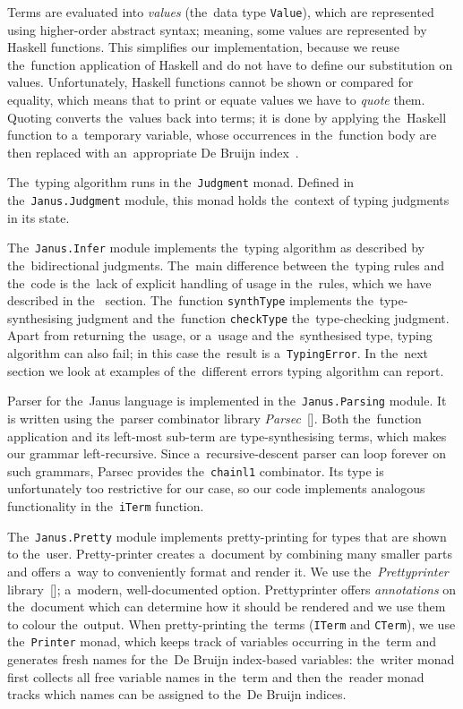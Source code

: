 Terms are evaluated into \emph{values} (the~data type \texttt{Value}), which are
represented using higher-order abstract syntax; meaning, some values are
represented by Haskell functions. This simplifies our implementation, because we
reuse the~function application of Haskell and do not have to define our
substitution on values. Unfortunately, Haskell functions cannot be shown or
compared for equality, which means that to print or equate values we have to
\emph{quote} them. Quoting converts the~values back into terms; it is done by
applying the~Haskell function to a~temporary variable, whose occurrences in
the~function body are then replaced with an~appropriate De Bruijn
index~\citep{loh_et_al_2010}.

The~typing algorithm runs in the~\texttt{Judgment} monad. Defined in
the~\texttt{Janus.Judgment} module, this monad holds the~context of typing
judgments in its state.

The~\texttt{Janus.Infer} module implements the~typing algorithm as described by
the~bidirectional judgments. The~main difference between the~typing rules and
the~code is the~lack of explicit handling of usage in the~rules, which we have
described in the~ section. The~function \texttt{synthType}
implements the~type-synthesising judgment and the~function \texttt{checkType}
the~type-checking judgment. Apart from returning the~usage, or a~usage and
the~synthesised type, typing algorithm can also fail; in this case the~result is
a~\texttt{TypingError}. In the~next section we look at examples of the~different
errors typing algorithm can report.

Parser for the~Janus language is implemented in the~\texttt{Janus.Parsing}
module. It is written using the~parser combinator library
\emph{Parsec}~[\citeauthor{parsec}]. Both the~function application and its
left-most sub-term are type-synthesising terms, which makes our grammar
left-recursive. Since a~recursive-descent parser can loop forever on such
grammars, Parsec provides the~\texttt{chainl1} combinator. Its type is
unfortunately too restrictive for our case, so our code implements analogous
functionality in the~\texttt{iTerm} function.

The~\texttt{Janus.Pretty} module implements pretty-printing for types that are
shown to the~user. Pretty-printer creates a~document by combining many smaller
parts and offers a~way to conveniently format and render it. We use
the~\emph{Prettyprinter} library~[\citeauthor{prettyprinter}]; a~modern,
well-documented option. Prettyprinter offers \emph{annotations} on the~document
which can determine how it should be rendered and we use them to colour
the~output. When pretty-printing the~terms (\texttt{ITerm} and \texttt{CTerm}),
we use the~\texttt{Printer} monad, which keeps track of variables occurring in
the~term and generates fresh names for the~De Bruijn index-based variables:
the~writer monad first collects all free variable names in the~term and then
the~reader monad tracks which names can be assigned to the~De Bruijn indices.

